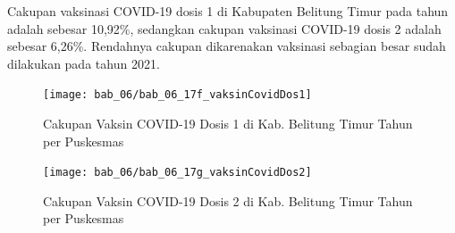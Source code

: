 Cakupan vaksinasi COVID-19 dosis 1 di Kabupaten Belitung Timur pada tahun \tP adalah sebesar 10,92\%, sedangkan cakupan vaksinasi COVID-19 dosis 2 adalah sebesar 6,26\%. Rendahnya cakupan dikarenakan vaksinasi sebagian besar sudah dilakukan pada tahun 2021.

\begin{figure}[H]
	\centering
	\texttt{[image: bab\_06/bab\_06\_17f\_vaksinCovidDos1]}
	\caption{Cakupan Vaksin COVID-19 Dosis 1 di Kab. Belitung Timur Tahun \tP per Puskesmas}
	\label{fig:vaksin-COVID-dosis-1}
\end{figure}

\begin{figure}[H]
	\centering
	\texttt{[image: bab\_06/bab\_06\_17g\_vaksinCovidDos2]}
	\caption{Cakupan Vaksin COVID-19 Dosis 2 di Kab. Belitung Timur Tahun \tP per Puskesmas}
	\label{fig:vaksin-COVID-dosis-2}
\end{figure}